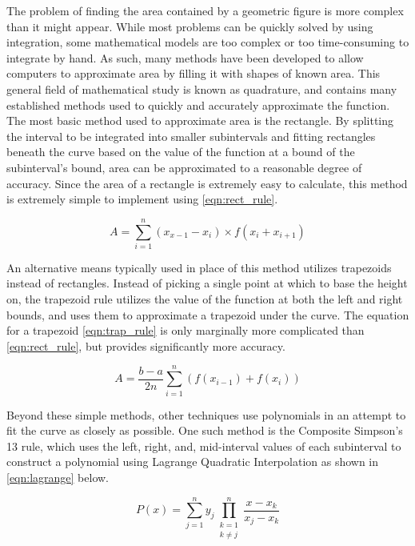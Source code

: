 \documentclass{paper}
\author{Grant Lemons}
\begin{document}

The problem of finding the area contained by a geometric figure is more complex than it might appear.
While most problems can be quickly solved by using integration, some mathematical models are too complex or too time-consuming to integrate by hand.
As such, many methods have been developed to allow computers to approximate area by filling it with shapes of known area.
This general field of mathematical study is known as quadrature, and contains many established methods used to quickly and accurately approximate the function.
The most basic method used to approximate area is the rectangle.
By splitting the interval to be integrated into smaller subintervals and fitting rectangles beneath the curve based on the value of the function at a bound of the subinterval's bound, area can be approximated to a reasonable degree of accuracy.
Since the area of a rectangle is extremely easy to calculate, this method is extremely simple to implement using \eqref{eqn:rect_rule}.

\begin{equation}
    \label{eqn:rect_rule}
    A = \sum_{i=1}^n (x_{x-1} - x_i) \times f(x_i + x_{i+1})
\end{equation}
 
An alternative means typically used in place of this method utilizes trapezoids instead of rectangles.
Instead of picking a single point at which to base the height on, the trapezoid rule utilizes the value of the function at both the left and right bounds, and uses them to approximate a trapezoid under the curve.
The equation for a trapezoid \eqref{eqn:trap_rule} is only marginally more complicated than \eqref{eqn:rect_rule}, but provides significantly more accuracy.

\begin{equation}
    \label{eqn:trap_rule}
    A = \dfrac{b - a}{2n} \sum_{i=1}^n (f(x_{i-1})+f(x_i))
\end{equation}

Beyond these simple methods, other techniques use polynomials in an attempt to fit the curve as closely as possible.
One such method is the Composite Simpson's 13 rule, which uses the left, right, and, mid-interval values of each subinterval to construct a polynomial using Lagrange Quadratic Interpolation as shown in \eqref{eqn:lagrange} below.

\begin{equation}
    \label{eqn:lagrange}
    P(x) = \sum_{j=1}^n y_j \prod_{\substack{k = 1 \\ k \neq j}}^n \dfrac{x - x_k}{x_j - x_k}
\end{equation}
\end{document}

